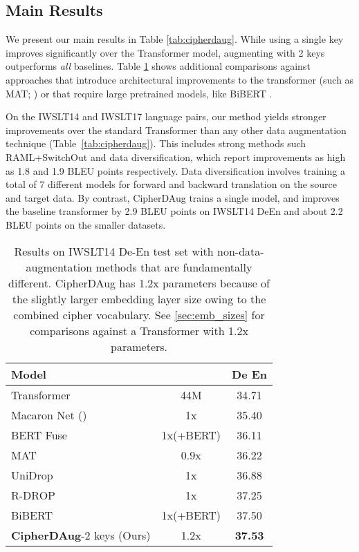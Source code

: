 \documentclass[11pt]{article}
\begin{document}
\subsection{Main Results}
We present our main results in Table \ref{tab:cipherdaug}. While using a single key improves significantly over the Transformer model, augmenting with 2 keys outperforms \textit{all} baselines. Table \ref{tab:cipher-vs-others} shows additional comparisons against approaches that introduce architectural improvements to the transformer (such as MAT; \citealt{fan2020multibranch}) or that require large pretrained models, like BiBERT \cite{xu2021bert}. 


On the IWSLT14 and IWSLT17 language pairs, our method yields stronger improvements over the standard Transformer than any other data augmentation technique (Table~\ref{tab:cipherdaug}). This includes strong methods such RAML+SwitchOut and data diversification, which report improvements as high as 1.8 and 1.9 BLEU points respectively. Data diversification involves training a total of 7 different models for forward and backward translation on the source and target data. By contrast, CipherDAug trains a single model, and improves the baseline transformer by 2.9 BLEU points on IWSLT14 DeEn and about 2.2 BLEU points on the smaller datasets. 



\begin{table}[!ht]
\small
\centering
\begin{tabular}{lcc}
\toprule
 \textbf{Model} &  &\textbf{De  En} \\ \midrule
 Transformer & 44M & 34.71 \\
 Macaron Net  (\citeyear{lu*2020understanding}) & 1x & 35.40 \\
 BERT Fuse \cite{Zhu2020Incorporating} & 1x(+BERT) & 36.11 \\
 MAT \cite{fan2020multibranch} & 0.9x & 36.22 \\ 
 UniDrop \cite{wu-etal-2021-unidrop} & 1x & 36.88 \\
 R-DROP \cite{liang2021rdrop} & 1x & 37.25 \\
 BiBERT \cite{xu2021bert} & 1x(+BERT) & 37.50 \\

 \midrule
 \textbf{CipherDAug}-2 keys (Ours) & 1.2x & \textbf{37.53} \\
 \bottomrule
\end{tabular}
\caption{Results on IWSLT14 De-En test set with non-data-augmentation methods that are fundamentally different. 
CipherDAug has 1.2x parameters because of the slightly larger embedding layer size owing to the combined cipher vocabulary. See \ref{sec:emb_sizes} for comparisons against a Transformer with 1.2x parameters.}
\label{tab:cipher-vs-others}
\end{table}
\end{document}

